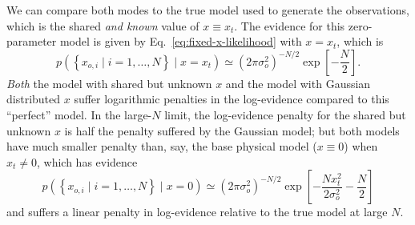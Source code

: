 \documentclass[modern]{aastex631}
\begin{document}
We can compare both modes to the true model used to generate the observations, which is the shared \emph{and known} value of $x \equiv x_t$.  The evidence for this zero-parameter model is given by Eq.\ \eqref{eq:fixed-x-likelihood} with $x = x_t$, which is 
\begin{equation}
    p\left(  \left\{ x_{o,i} \mid i = 1, \ldots, N \right\} \mid x = x_t \right) \simeq \left( 2 \pi \sigma_o^2 \right)^{-N/2} \exp\left[ - \frac{N}{2} \right].
\end{equation}
\emph{Both} the model with shared but unknown $x$ and the model with Gaussian
distributed $x$ suffer logarithmic penalties in the log-evidence compared to
this ``perfect'' model.  In the large-$N$ limit, the log-evidence penalty for
the shared but unknown $x$ is half the penalty suffered by the Gaussian model;
but both models have much smaller penalty than, say, the base physical model ($x
\equiv 0$) when $x_t \neq 0$, which has evidence 
\begin{equation}
    p\left(  \left\{ x_{o,i} \mid i = 1, \ldots, N \right\} \mid x = 0 \right) \simeq \left( 2 \pi \sigma_o^2 \right)^{-N/2} \exp\left[ - \frac{N x_t^2}{2 \sigma_o^2} - \frac{N}{2} \right]
\end{equation}
and suffers a linear penalty in log-evidence relative to the true model at large
$N$.

\clearpage 


\end{document}
